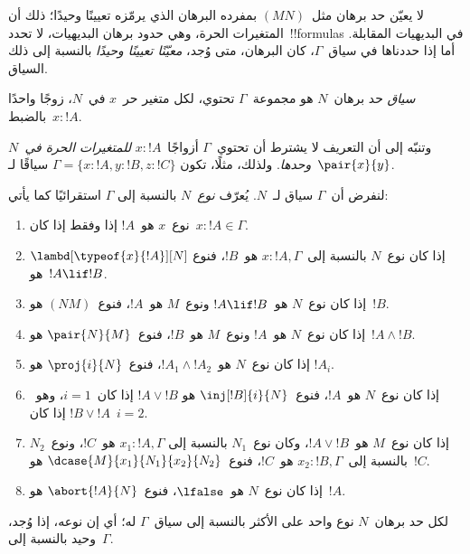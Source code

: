 \documentclass[../../../include/open-logic-section]{subfiles}
\begin{document}


لا يعيّن حد برهان مثل~$(MN)$ بمفرده البرهان الذي يرمّزه تعيينًا وحيدًا؛
ذلك أن المتغيرات الحرة، وهي حدود برهان البديهيات، لا تحدد~!!{formula}s في
البديهيات المقابلة. أما إذا حددناها في سياق~$\Gamma$، كان البرهان، متى
وُجد، \emph{معيّنًا تعيينًا وحيدًا} بالنسبة إلى ذلك السياق.

\begin{defn}
\emph{سياق} حد برهان~$N$ هو مجموعة~$\Gamma$ تحتوي، لكل متغير حر~$x$ في~$N$،
زوجًا واحدًا بالضبط~$x:!A$.
\end{defn}

وتنبّه إلى أن التعريف لا يشترط أن تحتوي~$\Gamma$ أزواجًا~$x:!A$
\emph{للمتغيرات الحرة في~$N$ وحدها}. ولذلك، مثلًا، تكون
$\Gamma=\{x:!A,y:!B,z:!C\}$ سياقًا لـ~$\pair{x}{y}$.

\begin{defn}
  لنفرض أن~$\Gamma$ سياق لـ~$N$. يُعرّف \emph{نوع}~$N$ بالنسبة إلى
  $\Gamma$ استقرائيًا كما يأتي:
  \begin{enumerate}
  \item نوع~$x$ هو~$!A$ إذا وفقط إذا كان~$x:!A\in\Gamma$.
  \item إذا كان نوع~$N$ بالنسبة إلى~$x:!A,\Gamma$ هو~$!B$، فنوع
    $\lambd[\typeof{x}{!A}][N]$ هو~$!A\lif !B$.
  \item إذا كان نوع~$N$ هو~$!A\lif !B$ ونوع~$M$ هو~$!A$، فنوع~$(NM)$
    هو~$!B$.
  \item إذا كان نوع~$N$ هو~$!A$ ونوع~$M$ هو~$!B$، فنوع~$\pair{N}{M}$
    هو~$!A\land !B$.
  \item إذا كان نوع~$N$ هو~$!A_1\land !A_2$، فنوع~$\proj{i}{N}$ هو
    $!A_i$.
  \item إذا كان نوع~$N$ هو~$!A$، فنوع~$\inj[!B]{i}{N}$ هو
    $!A\lor !B$ إذا كان~$i=1$، وهو~$!B\lor !A$ إذا كان~$i=2$.
  \item إذا كان نوع~$M$ هو~$!A\lor !B$، وكان نوع~$N_1$ بالنسبة إلى
    $x_1:!A,\Gamma$ هو~$!C$، ونوع~$N_2$ بالنسبة إلى~$x_2:!B,\Gamma$
    هو~$!C$، فنوع~$\dcase{M}{x_1}{N_1}{x_2}{N_2}$ هو~$!C$.
  \item إذا كان نوع~$N$ هو~$\lfalse$، فنوع~$\abort{!A}{N}$ هو~$!A$.
  \end{enumerate}
\end{defn}

\begin{prop}
لكل حد برهان~$N$ نوع واحد على الأكثر بالنسبة إلى سياق~$\Gamma$ له؛ أي إن
نوعه، إذا وُجد، وحيد بالنسبة إلى~$\Gamma$.
\end{prop}
\end{document}
